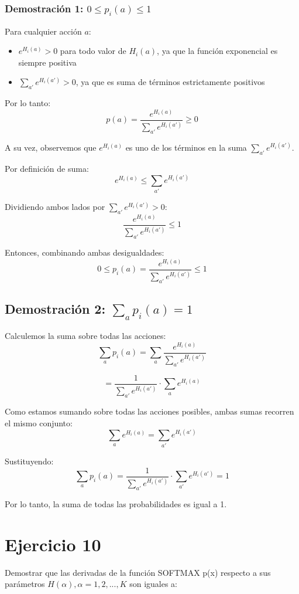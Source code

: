 \documentclass[12pt,a4paper]{article}
\begin{document}
\subsubsection{Demostración 1: $0 \leq p_i(a) \leq 1$}

Para cualquier acción $a$:
\begin{itemize}
    \item $e^{H_i(a)} > 0$ para todo valor de $H_i(a)$, ya que la función exponencial es siempre positiva
    \item $\sum_{a'} e^{H_i(a')} > 0$, ya que es suma de términos estrictamente positivos
\end{itemize}

Por lo tanto:
$$p(a) = \frac{e^{H_i(a)}}{\sum_{a'} e^{H_i(a')}} \geq 0$$

A su vez, observemos que $e^{H_i(a)}$ es uno de los términos en la suma $\sum_{a'} e^{H_i(a')}$.

Por definición de suma:
$$e^{H_i(a)} \leq \sum_{a'} e^{H_i(a')}$$

Dividiendo ambos lados por $\sum_{a'} e^{H_i(a')} > 0$:
$$\frac{e^{H_i(a)}}{\sum_{a'} e^{H_i(a')}} \leq 1$$

Entonces, combinando ambas desigualdades:
$$0 \leq p_i(a) = \frac{e^{H_i(a)}}{\sum_{a'} e^{H_i(a')}} \leq 1$$

\subsection{Demostración 2: $\sum_{a} p_i(a) = 1$}

Calculemos la suma sobre todas las acciones:
$$\sum_{a} p_i(a) = \sum_{a} \frac{e^{H_i(a)}}{\sum_{a'} e^{H_i(a')}}$$

$$= \frac{1}{\sum_{a'} e^{H_i(a')}} \cdot \sum_{a} e^{H_i(a)}$$

Como estamos sumando sobre todas las acciones posibles, ambas sumas recorren el mismo conjunto:
$$\sum_{a} e^{H_i(a)} = \sum_{a'} e^{H_i(a')}$$

Sustituyendo:
$$\sum_{a} p_i(a) = \frac{1}{\sum_{a'} e^{H_i(a')}} \cdot \sum_{a'} e^{H_i(a')} = 1$$

Por lo tanto, la suma de todas las probabilidades es igual a 1.

\section{Ejercicio 10}

Demostrar que las derivadas de la función SOFTMAX p(x) respecto a sus parámetros
$H(\alpha), \alpha = 1,2,...,K$ son iguales a:
\end{document}
